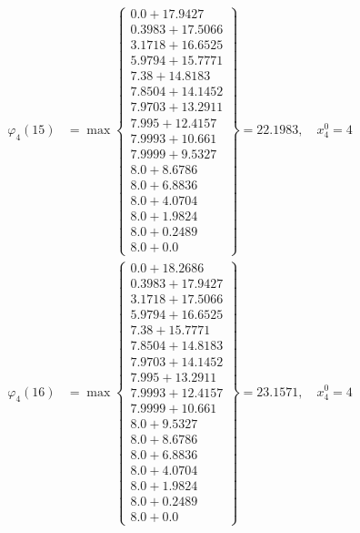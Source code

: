 \documentclass{article}
\begin{document}
\begin{align*}
  
\varphi_{4}(15) &= \max \left\{ \begin{array}{c}
0.0 + 17.9427 \\
 0.3983 + 17.5066 \\
 3.1718 + 16.6525 \\
 5.9794 + 15.7771 \\
 7.38 + 14.8183 \\
 7.8504 + 14.1452 \\
 7.9703 + 13.2911 \\
 7.995 + 12.4157 \\
 7.9993 + 10.661 \\
 7.9999 + 9.5327 \\
 8.0 + 8.6786 \\
 8.0 + 6.8836 \\
 8.0 + 4.0704 \\
 8.0 + 1.9824 \\
 8.0 + 0.2489 \\
 8.0 + 0.0
\end{array} \right\}=22.1983,\quad x_{4}^0=4\\
  
  
  
  
\varphi_{4}(16) &= \max \left\{ \begin{array}{c}
0.0 + 18.2686 \\
 0.3983 + 17.9427 \\
 3.1718 + 17.5066 \\
 5.9794 + 16.6525 \\
 7.38 + 15.7771 \\
 7.8504 + 14.8183 \\
 7.9703 + 14.1452 \\
 7.995 + 13.2911 \\
 7.9993 + 12.4157 \\
 7.9999 + 10.661 \\
 8.0 + 9.5327 \\
 8.0 + 8.6786 \\
 8.0 + 6.8836 \\
 8.0 + 4.0704 \\
 8.0 + 1.9824 \\
 8.0 + 0.2489 \\
 8.0 + 0.0
\end{array} \right\}=23.1571,\quad x_{4}^0=4\\
  
  
  

\end{align*}
\end{document}
